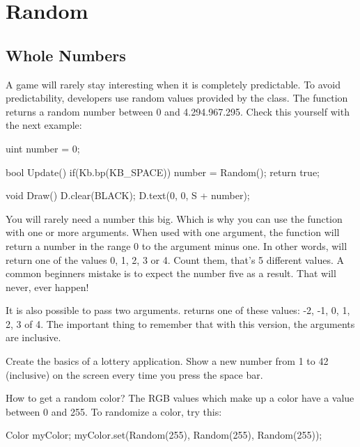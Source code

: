 \chapter{Random}

\section{Whole Numbers}
A game will rarely stay interesting when it is completely predictable. To avoid predictability, developers use random values provided by the  class. The function  returns a random number between 0 and 4.294.967.295. Check this yourself with the next example:

\begin{code}
uint number = 0;

bool Update() {
  if(Kb.bp(KB_SPACE)) number = Random();
	return true;
}

void Draw() {
	D.clear(BLACK);
	D.text(0, 0, S + number);
}
\end{code}

You will rarely need a number this big. Which is why you can use the  function with one or more arguments. When used with one argument, the function will return a number in the range 0 to the argument minus one. In other words,   will return one of the values 0, 1, 2, 3 or 4. Count them, that's 5 different values. A common beginners mistake is to expect the number five as a result. That will never, ever happen!

It is also possible to pass two arguments.  returns one of these values: -2, -1, 0, 1, 2, 3 of 4. The important thing to remember that with this version, the arguments are inclusive.

\begin{exercise}
Create the basics of a lottery application. Show a new number from 1 to 42 (inclusive) on the screen every time you press the space bar. 
\end{exercise}

\begin{note}
How to get a random color? The RGB values which make up a color have a value between 0 and 255. To randomize a color, try this:

\begin{code}
Color myColor;
myColor.set(Random(255), Random(255), Random(255));
\end{code}
\end{note}

